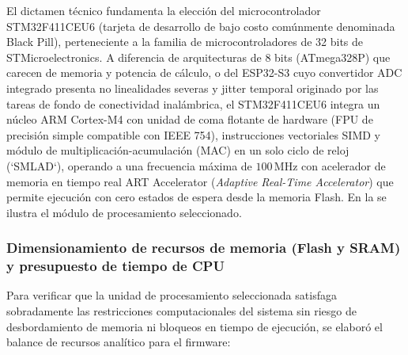El dictamen técnico fundamenta la elección del microcontrolador STM32F411CEU6 (tarjeta de desarrollo de bajo costo comúnmente denominada Black Pill), perteneciente a la familia de microcontroladores de 32 bits de STMicroelectronics. A diferencia de arquitecturas de 8 bits (ATmega328P) que carecen de memoria y potencia de cálculo, o del ESP32-S3 cuyo convertidor ADC integrado presenta no linealidades severas y jitter temporal originado por las tareas de fondo de conectividad inalámbrica, el STM32F411CEU6 integra un núcleo ARM Cortex-M4 con unidad de coma flotante de hardware (FPU de precisión simple compatible con IEEE 754), instrucciones vectoriales SIMD y módulo de multiplicación-acumulación (MAC) en un solo ciclo de reloj (`SMLAD`), operando a una frecuencia máxima de $100\,\text{MHz}$ con acelerador de memoria en tiempo real ART Accelerator (\textit{Adaptive Real-Time Accelerator}) que permite ejecución con cero estados de espera desde la memoria Flash. En la  se ilustra el módulo de procesamiento seleccionado.


\subsubsection{Dimensionamiento de recursos de memoria (Flash y SRAM) y presupuesto de tiempo de CPU}
\label{subsubsec:presupuesto_memoria_cpu}

Para verificar que la unidad de procesamiento seleccionada satisfaga sobradamente las restricciones computacionales del sistema sin riesgo de desbordamiento de memoria ni bloqueos en tiempo de ejecución, se elaboró el balance de recursos analítico para el firmware:

